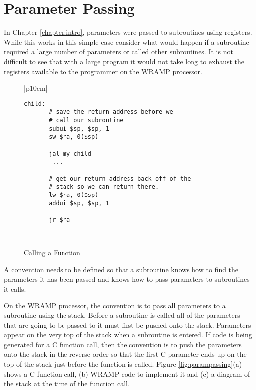\section{Parameter Passing}
In Chapter \ref{chapter:intro}, parameters were passed to
subroutines using registers. While this works in this simple case
consider what would happen if a subroutine required a large number of
parameters or called other subroutines. It is not difficult to see that
with a large program it would not take long to exhaust the registers
available to the programmer on the WRAMP processor.

%
%
\begin{figure}[!htbp]
\begin{footnotesize}
\begin{center}
\begin{tabular}{|p{10cm}|}
\hline
\begin{verbatim}
child:
       # save the return address before we
       # call our subroutine
       subui $sp, $sp, 1
       sw $ra, 0($sp)

       jal my_child
        ...

       # get our return address back off of the
       # stack so we can return there.
       lw $ra, 0($sp)
       addui $sp, $sp, 1

       jr $ra
\end{verbatim}
\\
\hline
\end{tabular}
\end{center}
\end{footnotesize}
\caption{Calling a Function}
\label{savera}
\end{figure}

A convention needs to be defined so that a subroutine knows how to
find the parameters it has been passed and knows how to pass
parameters to subroutines it calls.

On the WRAMP processor, the convention is to pass all parameters to a
subroutine using the stack. Before a subroutine is called all of the
parameters that are going to be passed to it must first be pushed onto
the stack. Parameters appear on the very top of the stack when a
subroutine is entered. If code is being generated for a C function
call, then the convention is to push the parameters onto the stack in
the reverse order so that the first C parameter ends up on the top of
the stack just before the function is called. Figure
\ref{fig:parampassing}(a) shows a C function call, (b) WRAMP code to
implement it and (c) a diagram of the stack at the time of the
function call.

